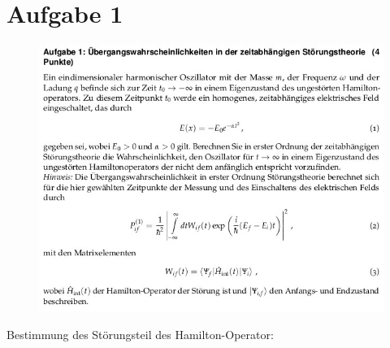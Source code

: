 \section{Aufgabe 1}
\begin{figure}[H]
    \centering
    \includegraphics[width=\textwidth]{images/ex1.jpg}
\end{figure}
Bestimmung des Störungsteil des Hamilton-Operator:
